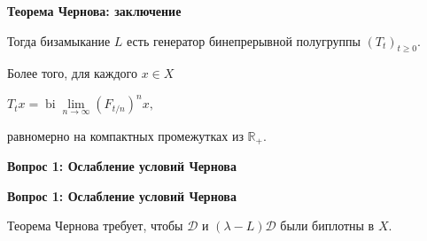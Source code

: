 \documentclass[11pt]{article}
\newcommand{\R}{\mathbb{R}}
\begin{document}
\newpage

\begin{center}
{\color{notaeYELLOW}\bfseries\fontsize{44}{52}\selectfont Теорема Чернова: заключение}
\end{center}
\vspace*{\fill}
\begin{center}
\fontsize{36}{43}\selectfont
\parbox{\linewidth}{\centering\noindent Тогда бизамыкание $L$ есть генератор бинепрерывной полугруппы $(T_t)_{t\ge0}$.
\par}\vspace{0.4in}
\parbox{\linewidth}{\centering\noindent Более того, для каждого $x\in X$
\par}\vspace{0.4in}
\parbox{\linewidth}{\centering\noindent $T_t x=\operatorname{bi}\lim\limits_{n\to\infty}(F_{t/n})^n x,$
\par}\vspace{0.4in}
\parbox{\linewidth}{\centering\noindent равномерно на компактных промежутках из $\R_+$.
\par}\vspace{0.4in}
\end{center}
\vspace*{\fill}

\newpage

\begin{center}
{\color{notaeYELLOW}\bfseries\fontsize{44}{52}\selectfont Вопрос 1: Ослабление условий Чернова}
\end{center}
\vspace*{\fill}
\begin{center}
\fontsize{36}{43}\selectfont
\end{center}
\vspace*{\fill}

\newpage

\begin{center}
{\color{notaeYELLOW}\bfseries\fontsize{44}{52}\selectfont Вопрос 1: Ослабление условий Чернова}
\end{center}
\vspace*{\fill}
\begin{center}
\fontsize{36}{43}\selectfont
\parbox{\linewidth}{\centering\noindent Теорема Чернова требует, чтобы $\mathcal{D}$ и $(\lambda-L)\mathcal{D}$ были биплотны в $X$.
\par}\vspace{0.4in}
\end{center}
\vspace*{\fill}
\end{document}
